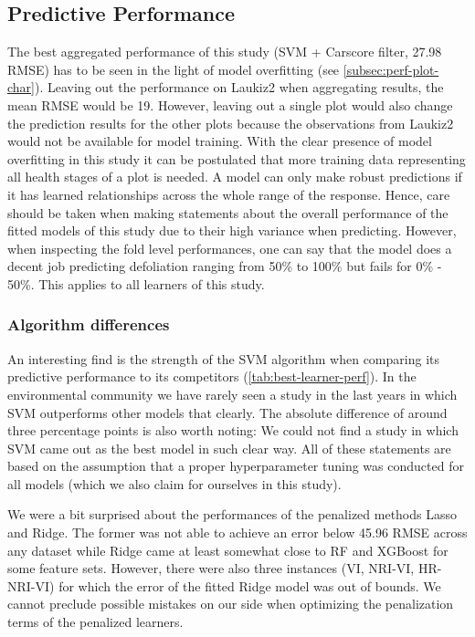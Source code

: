\documentclass[letterpaper, peerreview]{IEEEtran}
\begin{document}
\subsection{Predictive Performance}
The best aggregated performance of this study (SVM + Carscore filter, 27.98 RMSE) has to be seen in the light of model overfitting (see \autoref{subsec:perf-plot-char}).
Leaving out the performance on Laukiz2 when aggregating results, the mean RMSE would be 19.
However, leaving out a single plot would also change the prediction results for the other plots because the observations from Laukiz2 would not be available for model training.
With the clear presence of model overfitting in this study it can be postulated that more training data representing all health stages of a plot is needed.
A model can only make robust predictions if it has learned relationships across the whole range of the response.
Hence, care should be taken when making statements about the overall performance of the fitted models of this study due to their high variance when predicting.
However, when inspecting the fold level performances, one can say that the model does a decent job predicting defoliation ranging from 50\% to 100\% but fails for 0\% - 50\%.
This applies to all learners of this study.

\subsubsection{Algorithm differences}
An interesting find is the strength of the SVM algorithm when comparing its predictive performance to its competitors (\autoref{tab:best-learner-perf}).
In the environmental community we have rarely seen a study in the last years in which SVM outperforms other models that clearly.
The absolute difference of around three percentage points is also worth noting: We could not find a study in which SVM came out as the best model in such clear way.
All of these statements are based on the assumption that a proper hyperparameter tuning was conducted for all models (which we also claim for ourselves in this study).

We were a bit surprised about the performances of the penalized methods Lasso and Ridge.
The former was not able to achieve an error below 45.96 RMSE across any dataset while Ridge came at least somewhat close to RF and XGBoost for some feature sets.
However, there were also three instances (VI, NRI-VI, HR-NRI-VI) for which the error of the fitted Ridge model was out of bounds.
We cannot preclude possible mistakes on our side when optimizing the penalization terms of the penalized learners.
\end{document}
